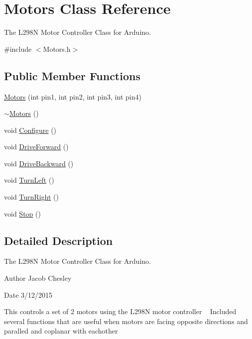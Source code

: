 \hypertarget{class_motors}{}\section{Motors Class Reference}
\label{class_motors}


The L298\+N Motor Controller Class for Arduino.  




{\ttfamily \#include $<$Motors.\+h$>$}

\subsection*{Public Member Functions}
\begin{DoxyCompactItemize}
\item 
\hyperlink{class_motors_aace1b69a19413c5d38dd203550b06bd5}{Motors} (int pin1, int pin2, int pin3, int pin4)
\item 
\hyperlink{class_motors_ab9d527a65397c54bd24c364b22b31317}{$\sim$\+Motors} ()
\item 
void \hyperlink{class_motors_a2e52af966b6baf287160948bb74f8b11}{Configure} ()
\item 
void \hyperlink{class_motors_a0eb037c35436f6687910407eb490bf28}{Drive\+Forward} ()
\item 
void \hyperlink{class_motors_aeddfda1a66ef545f02c8f5f6a31a9285}{Drive\+Backward} ()
\item 
void \hyperlink{class_motors_a108b243a514918461f19ff5fdd86f560}{Turn\+Left} ()
\item 
void \hyperlink{class_motors_af78dff344c31c67be70498428ce61b89}{Turn\+Right} ()
\item 
void \hyperlink{class_motors_abfecdef2716a275d5740572db585576c}{Stop} ()
\end{DoxyCompactItemize}


\subsection{Detailed Description}
The L298\+N Motor Controller Class for Arduino. 

\begin{DoxyAuthor}{Author}
Jacob Chesley 
\end{DoxyAuthor}
\begin{DoxyDate}{Date}
3/12/2015
\end{DoxyDate}
This controls a set of 2 motors using the L298\+N motor controller ~\newline
 Included several functions that are useful when motors are facing opposite directions and paralled and coplanar with eachother

